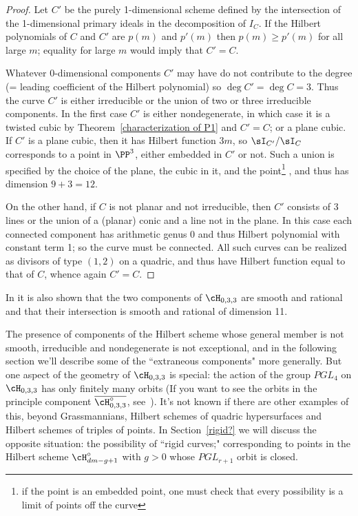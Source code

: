 \begin{proof}
Let $C'$ be the purely 1-dimensional scheme defined by the intersection of the 1-dimensional primary ideals in the decomposition of $I_C$. If the Hilbert polynomials of $C$ and $C'$ are $p(m)$ and  $p'(m)$ then
$p(m) \geq p'(m)$ for all large $m$; equality for large $m$ would imply that $C'=C$.

Whatever 0-dimensional components $C'$ may have do not contribute to the degree (= leading coefficient of the Hilbert polynomial) so $\deg C' = \deg C = 3$. Thus the curve $C'$ is either irreducible or the union of two or three irreducible components. In the first case $C'$ is either nondegenerate, in which case it is a twisted cubic by Theorem~\ref{characterization of P1} and $C' = C$; or a plane cubic. If $C'$ is a plane cubic, then it has Hilbert function $3m$, so $\sI_{C'}/\sI_C$
corresponds to a point in $\PP^3$, either embedded in $C'$ or not. Such a union is specified by the choice of the
plane, the cubic in it, and the point\footnote{if the point is an embedded point, one must check that every possibility
is a limit of points off the curve} , and thus has dimension $9+3 = 12.$

On the other hand, if $C$ is not planar and not irreducible, then $C'$ consists of 3 lines or the union of a (planar) conic
and a line not in the plane. In this case each connected component has arithmetic genus 0 and thus Hilbert polynomial
with constant term 1; so the curve must be connected. All such curves can be realized as divisors of type $(1,2)$
on a quadric, and thus have Hilbert function equal to that of $C$, whence again $C' = C$.
\end{proof}



\begin{fact}
In \cite{Piene-Schlessinger} it is also shown that the two components of $\cH_{0,3,3}$ are smooth and rational and that
their  intersection is  smooth and rational of dimension 11.
\end{fact}

The presence of components of the Hilbert scheme whose general member is not smooth, irreducible and nondegenerate is not exceptional, and in the following section we'll describe some of the ``extraneous components" more generally. But one aspect of the geometry of $\cH_{0,3,3}$ is special: the action of the group $PGL_4$ on $\cH_{0,3,3}$ has only finitely many orbits (If you want to see the orbits in the principle component $\overline{\cH^\circ_{0,3,3}}$, see~\cite{Montreal}). It's not known if there are other examples of this, beyond Grassmannians, Hilbert schemes of quadric hypersurfaces and Hilbert schemes of triples of points.  In Section~\ref{rigid?} we will discuss the opposite situation: the possibility of ``rigid curves;"  corresponding to points in the Hilbert scheme $\cH^{\circ}_{dm-g+1}$ with $g>0$ whose $PGL_{r+1}$ orbit is closed.

